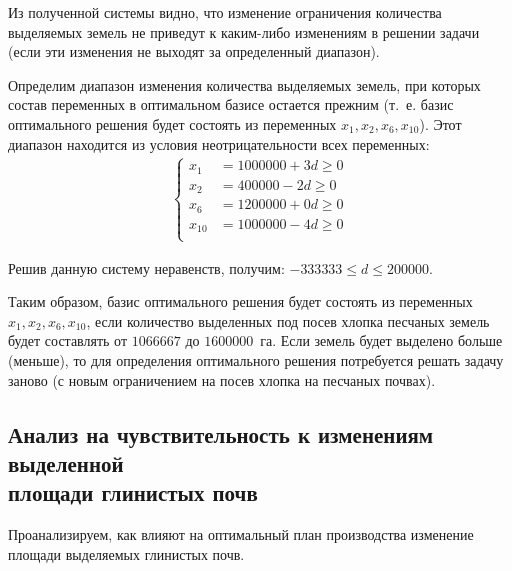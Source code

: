 Из полученной системы видно, что изменение ограничения количества выделяемых земель не приведут к каким-либо изменениям в решении задачи (если эти изменения не выходят за определенный диапазон).

Определим диапазон изменения количества выделяемых земель, при которых состав переменных в оптимальном базисе остается прежним (т.~е. базис оптимального решения будет состоять из переменных $ x_1, x_2, x_6, x_{10} $). Этот диапазон находится из условия неотрицательности всех переменных:
\begin{equation}
	\begin{aligned}
  	\left\{
    	\begin{aligned}
	      x_1 & = 1 000 000 + 3d \ge 0 \\
	      x_2 & = 400 000 - 2d \ge 0\\
	      x_6 & = 1 200 000 + 0d \ge 0 \\
	      x_{10} & = 1 000 000 - 4d \ge 0\\ 
    	\end{aligned}
  	\right.
	\end{aligned}
\end{equation}

Решив данную систему неравенств, получим: $ -333 333 \le d \le 200 000 $.

Таким образом, базис оптимального решения будет состоять из переменных $ x_1, x_2, x_6, x_{10} $, если количество выделенных под посев хлопка песчаных земель будет составлять от $ 1 066 667 $ до $ 1 600 000 $~га. Если земель будет выделено больше (меньше), то для определения оптимального решения потребуется решать задачу заново (с новым ограничением на посев хлопка на песчаных почвах).




\subsection[Анализ на чувствительность к изменениям выделенной \\ площади глинистых почв]{Анализ на чувствительность к изменениям выделенной \\ площади глинистых почв}

Проанализируем, как влияют на оптимальный план производства изменение площади выделяемых глинистых почв.

